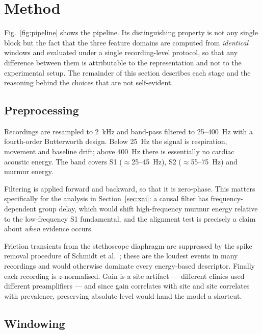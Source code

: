 \section{Method}



Fig.~\ref{fig:pipeline} shows the pipeline. Its distinguishing property is not
any single block but the fact that the three feature domains are computed from
\emph{identical} windows and evaluated under a single recording-level protocol,
so that any difference between them is attributable to the representation and
not to the experimental setup. The remainder of this section describes each
stage and the reasoning behind the choices that are not self-evident.

\subsection{Preprocessing}


Recordings are resampled to \SI{2}{\kilo\hertz} and band-pass filtered to
25--\SI{400}{\hertz} with a fourth-order Butterworth design. Below
\SI{25}{\hertz} the signal is respiration, movement and baseline drift; above
\SI{400}{\hertz} there is essentially no cardiac acoustic energy. The band
covers S1 ($\approx$25--\SI{45}{\hertz}), S2 ($\approx$55--\SI{75}{\hertz}) and
murmur energy.

Filtering is applied forward and backward, so that it is zero-phase. This
matters specifically for the analysis in Section~\ref{sec:xai}: a causal filter
has frequency-dependent group delay, which would shift high-frequency murmur
energy relative to the low-frequency S1 fundamental, and the alignment test is
precisely a claim about \emph{when} evidence occurs.

Friction transients from the stethoscope diaphragm are suppressed by the spike
removal procedure of Schmidt et al.~\cite{schmidt2010segmentation}; these are
the loudest events in many recordings and would otherwise dominate every
energy-based descriptor. Finally each recording is $z$-normalised. Gain is a
site artifact --- different clinics used different preamplifiers --- and since
gain correlates with site and site correlates with prevalence, preserving
absolute level would hand the model a shortcut.

\subsection{Windowing}

